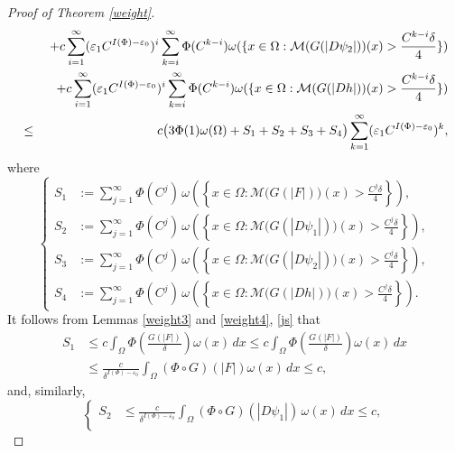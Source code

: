 \documentclass[10pt,a4paper]{article}
\theoremstyle{definition}
\numberwithin{equation}{section}
\begin{document}
\begin{proof}[Proof of Theorem \ref{weight}]
{\begin{eqnarray*}
&&\hspace{0.1cm}+ c \sum_{i=1}^{\infty} (\varepsilon_1 C^{I(\Phi) - \varepsilon_0})^i \sum_{k=i}^{\infty} \Phi(C^{k-i}) \omega(\{x \in \Omega : \mathcal{M}(G(|D\psi_2|))(x) > \frac{C^{k-i} \delta}{4}\}) \\
&&\hspace{0.1cm}+ c \sum_{i=1}^{\infty} (\varepsilon_1 C^{I(\Phi) - \varepsilon_0})^i \sum_{k=i}^{\infty} \Phi(C^{k-i}) \omega(\{x \in \Omega : \mathcal{M}(G(|Dh|))(x) > \frac{C^{k-i} \delta}{4}\}) \\
&\leq& c\bigl(3\Phi(1)\omega(\Omega) + S_1 + S_2+ S_3+ S_4 \bigr) \sum_{k=1}^{\infty} (\varepsilon_1 C^{I(\Phi) - \varepsilon_0})^k,
\end{eqnarray*}
where
\begin{equation*}
	\left\{
	\begin{aligned}
		S_1
		&:= \sum_{j=1}^{\infty}\Phi(C^j)\,
		\omega\left(
		\left\{
		x\in\Omega:
		\mathcal{M}\bigl(G(|F|)\bigr)(x)
		> \frac{C^j\delta}{4}
		\right\}
		\right),
		\\[0.15cm]
		S_2
		&:= \sum_{j=1}^{\infty}\Phi(C^j)\,
		\omega\left(
		\left\{
		x\in\Omega:
		\mathcal{M}\bigl(G(|D\psi_1|)\bigr)(x)
		> \frac{C^j\delta}{4}
		\right\}
		\right),
		\\[0.15cm]
		S_3
		&:= \sum_{j=1}^{\infty}\Phi(C^j)\,
		\omega\left(
		\left\{
		x\in\Omega:
		\mathcal{M}\bigl(G(|D\psi_2|)\bigr)(x)
		> \frac{C^j\delta}{4}
		\right\}
		\right),
		\\[0.15cm]
		S_4
		&:= \sum_{j=1}^{\infty}\Phi(C^j)\,
		\omega\left(
		\left\{
		x\in\Omega:
		\mathcal{M}\bigl(G(|Dh|)\bigr)(x)
		> \frac{C^j\delta}{4}
		\right\}
		\right).
	\end{aligned}
	\right.
\end{equation*}
It follows from Lemmas \ref{weight3}  and \ref{weight4}, \eqref{js} that
\begin{align*}
S_1 &\leq c \int_{\Omega} \Phi\left(\frac{G(|F|)}{\delta}\right) \omega(x)\,dx
 \leq c \int_{\Omega} \Phi\left(\frac{G(|F|)}{\delta}\right) \omega(x)\,dx \\
    &\leq \frac{c}{\delta^{I(\Phi) - \varepsilon_0}} \int_{\Omega} (\Phi \circ G)(|F|) \omega(x)\,dx
\leq c,
\end{align*}
and, similarly,
\begin{equation*}
	\left\{
	\begin{aligned}
		S_2
		&\leq
		\frac{c}{\delta^{I(\Phi)-\varepsilon_0}}
		\int_{\Omega}
		(\Phi\circ G)(|D\psi_1|)\,\omega(x)\,dx
		\leq c,
		\\[0.2cm]

\end{aligned}
\end{equation*}}
\end{proof}
\end{document}
